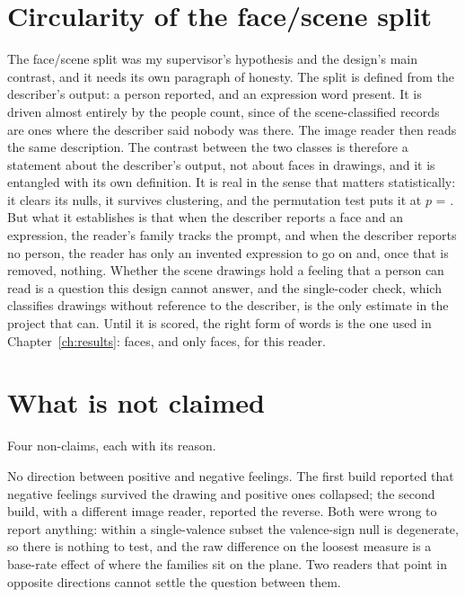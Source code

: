 \section{Circularity of the face/scene split}
\label{sec:disc-circularity}

The face/scene split was my supervisor's hypothesis and the design's main contrast, and it needs its own paragraph of honesty. The split is defined from the describer's output: a person reported, and an expression word present. It is driven almost entirely by the people count, since \DescScenePeopleZero{} of the \DescSceneN{} scene-classified records are ones where the describer said nobody was there. The image reader then reads the same description. The contrast between the two classes is therefore a statement about the describer's output, not about faces in drawings, and it is entangled with its own definition. It is real in the sense that matters statistically: it clears its nulls, it survives clustering, and the permutation test puts it at $p$ = \DiffSignP{}. But what it establishes is that when the describer reports a face and an expression, the reader's family tracks the prompt, and when the describer reports no person, the reader has only an invented expression to go on and, once that is removed, nothing. Whether the scene drawings hold a feeling that a person can read is a question this design cannot answer, and the single-coder check, which classifies drawings without reference to the describer, is the only estimate in the project that can. Until it is scored, the right form of words is the one used in Chapter~\ref{ch:results}: faces, and only faces, for this reader.

\section{What is not claimed}
\label{sec:disc-not-claimed}

Four non-claims, each with its reason.

No direction between positive and negative feelings. The first build reported that negative feelings survived the drawing and positive ones collapsed; the second build, with a different image reader, reported the reverse. Both were wrong to report anything: within a single-valence subset the valence-sign null is degenerate, so there is nothing to test, and the raw difference on the loosest measure is a base-rate effect of where the families sit on the plane. Two readers that point in opposite directions cannot settle the question between them.

